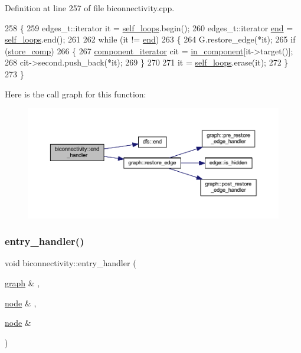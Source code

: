 Definition at line 257 of file biconnectivity.\+cpp.


\begin{DoxyCode}
258 \{
259     edges\_t::iterator it = \mbox{\hyperlink{classbiconnectivity_ad6b936f8450b97a34c93c7c2196571a1}{self\_loops}}.begin();
260     edges\_t::iterator \mbox{\hyperlink{classdfs_af847633fa642258d3522e8deb26aef37}{end}} = \mbox{\hyperlink{classbiconnectivity_ad6b936f8450b97a34c93c7c2196571a1}{self\_loops}}.end();
261 
262     \textcolor{keywordflow}{while} (it != \mbox{\hyperlink{classdfs_af847633fa642258d3522e8deb26aef37}{end}})
263     \{
264         G.restore\_edge(*it);
265         \textcolor{keywordflow}{if} (\mbox{\hyperlink{classbiconnectivity_a989307b07f4a976649bd7551173bd564}{store\_comp}})
266         \{
267             \mbox{\hyperlink{classbiconnectivity_aef69aa0c23bfcd945e385350154b6483}{component\_iterator}} cit = \mbox{\hyperlink{classbiconnectivity_a487da69817fa89ab3d1523ad9846ae8e}{in\_component}}[it->target()];
268             cit->second.push\_back(*it);
269         \}
270 
271         it = \mbox{\hyperlink{classbiconnectivity_ad6b936f8450b97a34c93c7c2196571a1}{self\_loops}}.erase(it);
272     \}
273 \}
\end{DoxyCode}
Here is the call graph for this function\+:\nopagebreak
\begin{figure}[H]
\begin{center}
\leavevmode
\includegraphics[width=350pt]{classbiconnectivity_a2583331a4561f3db221ab674d2e5d75e_cgraph}
\end{center}
\end{figure}
\mbox{\label{classbiconnectivity_acb402f2d144f84429b3cd009121245b0}} 
\subsubsection{\texorpdfstring{entry\+\_\+handler()}{entry\_handler()}}
{\footnotesize\ttfamily void biconnectivity\+::entry\+\_\+handler (\begin{DoxyParamCaption}\item[{\mbox{\hyperlink{classgraph}{graph}} \&}]{,  }\item[{\mbox{\hyperlink{classnode}{node}} \&}]{,  }\item[{\mbox{\hyperlink{classnode}{node}} \&}]{ }\end{DoxyParamCaption})\hspace{0.3cm}{\ttfamily [virtual]}}




